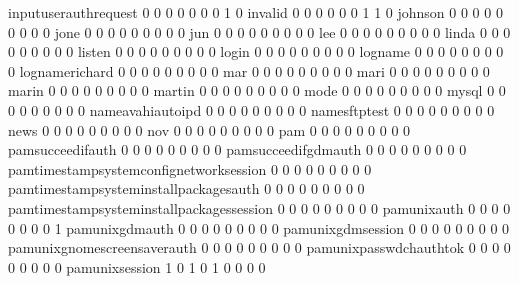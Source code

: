 \documentclass[compress,8pt]{beamer}
\begin{document}
\begin{frame}
\begin{Schunk}
  inputuserauthrequest                       0   0   0   0   0   0   0   1   0
  invalid                                    0   0   0   0   0   0   1   1   0
  johnson                                    0   0   0   0   0   0   0   0   0
  jone                                       0   0   0   0   0   0   0   0   0
  jun                                        0   0   0   0   0   0   0   0   0
  lee                                        0   0   0   0   0   0   0   0   0
  linda                                      0   0   0   0   0   0   0   0   0
  listen                                     0   0   0   0   0   0   0   0   0
  login                                      0   0   0   0   0   0   0   0   0
  logname                                    0   0   0   0   0   0   0   0   0
  lognamerichard                             0   0   0   0   0   0   0   0   0
  mar                                        0   0   0   0   0   0   0   0   0
  mari                                       0   0   0   0   0   0   0   0   0
  marin                                      0   0   0   0   0   0   0   0   0
  martin                                     0   0   0   0   0   0   0   0   0
  mode                                       0   0   0   0   0   0   0   0   0
  mysql                                      0   0   0   0   0   0   0   0   0
  nameavahiautoipd                           0   0   0   0   0   0   0   0   0
  namesftptest                               0   0   0   0   0   0   0   0   0
  news                                       0   0   0   0   0   0   0   0   0
  nov                                        0   0   0   0   0   0   0   0   0
  pam                                        0   0   0   0   0   0   0   0   0
  pamsucceedifauth                           0   0   0   0   0   0   0   0   0
  pamsucceedifgdmauth                        0   0   0   0   0   0   0   0   0
  pamtimestampsystemconfignetworksession     0   0   0   0   0   0   0   0   0
  pamtimestampsysteminstallpackagesauth      0   0   0   0   0   0   0   0   0
  pamtimestampsysteminstallpackagessession   0   0   0   0   0   0   0   0   0
  pamunixauth                                0   0   0   0   0   0   0   0   1
  pamunixgdmauth                             0   0   0   0   0   0   0   0   0
  pamunixgdmsession                          0   0   0   0   0   0   0   0   0
  pamunixgnomescreensaverauth                0   0   0   0   0   0   0   0   0
  pamunixpasswdchauthtok                     0   0   0   0   0   0   0   0   0
  pamunixsession                             1   0   1   0   1   0   0   0   0

\end{Schunk}
\end{frame}
\end{document}
